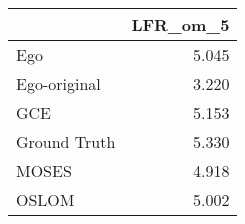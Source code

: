 \begin{tabular}{lr}
\toprule
{} & LFR_om_5 \\
\midrule
Ego          &    5.045 \\
Ego-original &    3.220 \\
GCE          &    5.153 \\
Ground Truth &    5.330 \\
MOSES        &    4.918 \\
OSLOM        &    5.002 \\
\bottomrule
\end{tabular}

